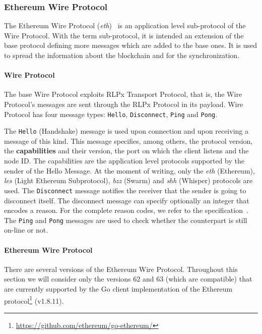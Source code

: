 \subsubsection{Ethereum Wire Protocol}
\label{sec:ethereum-wire-protocol}

The Ethereum Wire Protocol (\emph{eth})~\cite{bib:ethereumwireprotocol}  is an
application level sub-protocol of the \devpp{} Wire Protocol. With the term
sub-protocol, it is intended an extension of the base protocol defining more
messages which are added to the base ones. It is used to spread the information
about the blockchain and for the synchronization.

\paragraph{\devpp{} Wire Protocol}
The base \devpp{} Wire Protocol exploits RLPx Transport Protocol, that is, the
\devpp{} Wire Protocol's messages are sent through the RLPx Protocol in its
payload. \devpp{} Wire Protocol has four message types: \verb+Hello+,
\verb+Disconnect+, \verb+Ping+ and \verb+Pong+.

The \verb+Hello+ (Handshake) message is used upon connection and upon receiving
a message of this kind. This message specifies, among others, the protocol
version, the \textbf{capabilities} and their version, the port on which the
client listens and the node ID. The capabilities are the application level
protocols supported by the sender of the Hello Message. At the moment of
writing, only the \emph{eth} (Ethereum), \emph{les} (Light Ethereum
Subprotocol), \emph{bzz} (Swarm) and \emph{shh} (Whisper) protocols are used.
The \verb+Disconnect+ message notifies the receiver that the sender is going to
disconnect itself. The disconnect message can specify optionally an integer that
encodes a reason. For the complete reason codes, we refer to the \devpp{}
specification~\cite{devp2pwire}. The \verb+Ping+ and \verb+Pong+ messages are
used to check whether the counterpart is still on-line or not.

\paragraph{Ethereum Wire Protocol}
There are several versions of the Ethereum Wire Protocol. Throughout this 
section we will consider only the versions $62$ and $63$ (which are compatible) 
that are currently supported by the Go client implementation of the Ethereum 
protocol\footnote{\url{https://github.com/ethereum/go-ethereum/}}
(v1.8.11).

